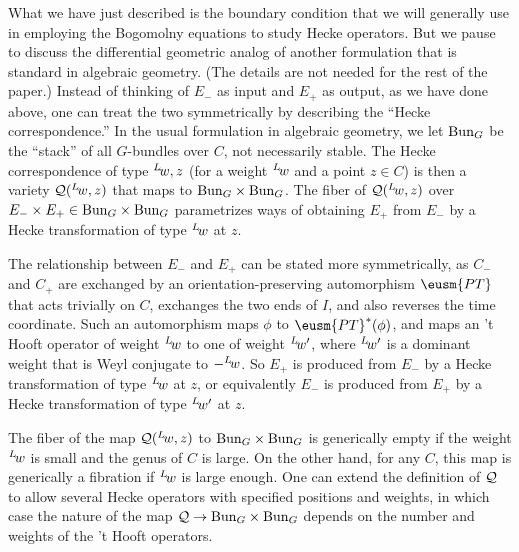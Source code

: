 \par{}

What we have just described is the boundary condition that we will
generally use in employing the Bogomolny equations to study Hecke
operators. But we pause to discuss the differential geometric
analog of another formulation that is standard in algebraic
geometry. (The details are not needed for the rest of the paper.)
Instead of thinking of $E_-$ as input and $E_+$ as output, as we
have done above,  one can treat the two symmetrically by
describing the ``Hecke correspondence.'' In the usual formulation
in algebraic geometry, we let ${\rm Bun}_G$ be the ``stack'' of
all $G$-bundles over $C$, not necessarily stable. The Hecke
correspondence of type $^L\negthinspace w,z$ (for a weight
$^L\negthinspace w$ and a point $z\in C$) is then a variety ${\cal
Q}(^L\negthinspace w,z)$ that maps to ${\rm Bun}_G\times {\rm
Bun}_G$. The fiber of ${\cal Q}(^L\negthinspace w,z)$ over
$E_-\times E_+\in {\rm Bun}_G\times {\rm Bun}_G$ parametrizes ways
of obtaining $E_+$ from $E_-$ by a Hecke transformation of type
$^L\negthinspace w$ at $z$.

\def\EUPT{\eusm{PT}}
The relationship between $E_-$ and $E_+$ can be stated more
symmetrically, as $C_-$ and $C_+$ are exchanged by an
orientation-preserving automorphism $\EUPT$ that acts trivially on
$C$, exchanges the two ends of $I$, and also reverses the time
coordinate.   Such an automorphism maps $\phi$ to $\EUPT^*(\phi)$,
and maps an 't Hooft operator of weight $^L\negthinspace w$ to one
of weight $^L\negthinspace w'$, where $^L\negthinspace w'$ is a
dominant weight that is Weyl conjugate to $-{}^L\negthinspace w$.
So $E_+$ is produced from $E_-$ by a Hecke transformation of type
$^L\negthinspace w$ at $z$, or equivalently $E_-$ is produced from
$E_+$ by a Hecke transformation of type $^L\negthinspace w'$ at
$z$.

The fiber of the map ${\cal Q}({}^L\negthinspace w,z)$ to ${\rm
Bun}_G\times {\rm Bun}_G$ is generically empty if the weight
$^L\negthinspace w$ is small and the genus of $C$ is large. On the
other hand, for any $C$, this map is generically a fibration if
$^L\negthinspace w$ is large enough. One can extend the definition
of ${\cal Q}$ to allow several Hecke operators with specified
positions and weights, in which case the nature of the map ${\cal
Q}\to {\rm Bun}_G\times {\rm Bun}_G$ depends on the number and
weights of the 't Hooft operators.

